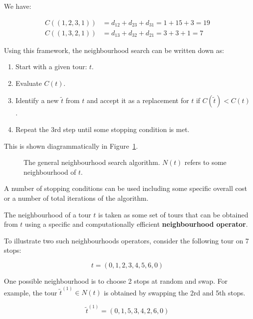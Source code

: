 We have:

\begin{eqnarray*}
    C((1, 2, 3, 1)) &= d_{12} + d_{23} + d_{31} = 1 + 15 + 3 = 19\\
    C((1, 3, 2, 1)) &= d_{13} + d_{32} + d_{21} = 3 + 3 + 1 = 7
\end{eqnarray*}

Using this framework, the neighbourhood search can be written down as:

\begin{enumerate}
    \item Start with a given tour: \(t\).
    \item Evaluate \(C(t)\).
    \item Identify a new \(\tilde t\) from \(t\) and accept it as a replacement
        for \(t\) if \(C(\tilde t)< C(t)\).
    \item Repeat the 3rd step until some stopping condition is met.
\end{enumerate}

This is shown diagrammatically in
Figure~\ref{fig:neighbourhood_search_flow_diagram}.

\begin{figure}[!hbtp]
    \begin{center}
        
    \end{center}
    \caption{The general neighbourhood search algorithm. \(N(t)\) refers to some
    neighbourhood of \(t\).}
    \label{fig:neighbourhood_search_flow_diagram}
\end{figure}

A number of stopping conditions can be used including some specific
overall cost or a number of total iterations of the algorithm.

The neighbourhood of a tour \(t\) is taken as some set of tours that can be
obtained from \(t\) using a specific and computationally efficient
\textbf{neighbourhood operator}.

To illustrate two such neighbourhoods operators, consider the following tour on
7 stops:

\[
    t = (0, 1, 2, 3, 4, 5, 6, 0)
\]

One possible neighbourhood is to choose 2 stops at random and swap. For
example, the tour \(\tilde t^{(1)}\in N(t)\) is obtained by swapping the 2rd and 5th
stops.

\[
    \tilde t^{(1)} = (0, 1, 5, 3, 4, 2, 6, 0)
\]

